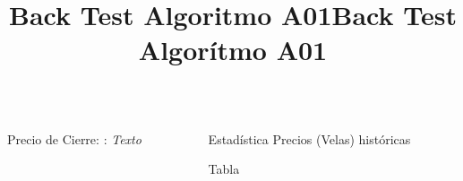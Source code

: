 \documentclass[final, xcolor=table]{beamer}\usepackage[]{graphicx}\usepackage[]{color}
\title{\Huge Back Test Algoritmo A01}
\institute{\Large Box Jenkins para series de tiempo financieras}
\begin{document}
\title{Back Test Algor\'itmo A01}
\begin{frame}


\begin{columns}[t]


\begin{column}{.66 \linewidth}

  \begin{block}{\small Precio de Cierre: } : 
  \textit{Texto}


  \end{block}
  
\end{column}


\begin{column}{.32 \linewidth}
\begin{block}{\small Estad\'istica Precios (Velas) hist\'oricas}

  Tabla

\end{block}
\end{column}

\end{columns}


\begin{columns}[t]


\end{columns}
\end{frame}
\end{document}
